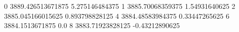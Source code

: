 0 3889.426513671875 5.275146484375
1 3885.70068359375 1.54931640625
2 3885.045166015625 0.893798828125
4 3884.48583984375 0.33447265625
6 3884.1513671875 0.0
8 3883.71923828125 -0.43212890625
